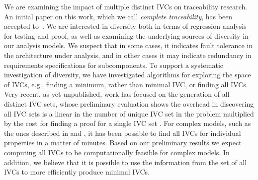 We are examining the impact of multiple distinct IVCs on traceability
research.  An initial paper on this work, which we call {\em complete traceability},
has been accepted to~\cite{Murugesan16:renext}.  We are interested in diversity both
in terms of regression analysis for testing and proof, as well as examining
the underlying sources of diversity in our analysis models.  We suspect that
in some cases, it indicates fault tolerance in the architecture under analysis,
and in other cases it may indicate redundancy in requirements specifications
for subcomponents.  To support a systematic investigation of diversity, we
have investigated algorithms for exploring the space of IVCs, e.g., finding
a minimum, rather than minimal IVC, or finding all IVCs. Very recent, as yet unpublished, work has focused on the
generation of all distinct IVC sets, whose preliminary evaluation
shows the overhead in discovering all IVC sets is a linear in the
number of unique IVC set in the problem multiplied by the cost
for finding a proof for a single IVC set \cite{allIvcs}. For complex models, such
as the ones described in \cite {QFCS15:backes} and \cite{hilt2013}, it has been possible to
find all IVCs for individual properties in a matter of minutes.
Based on our preliminary results we expect computing all IVCs to be computationally feasible for complex models. In
addition, we believe that it is possible to use the information
from the set of all IVCs to more efficiently produce minimal
IVCs. 
